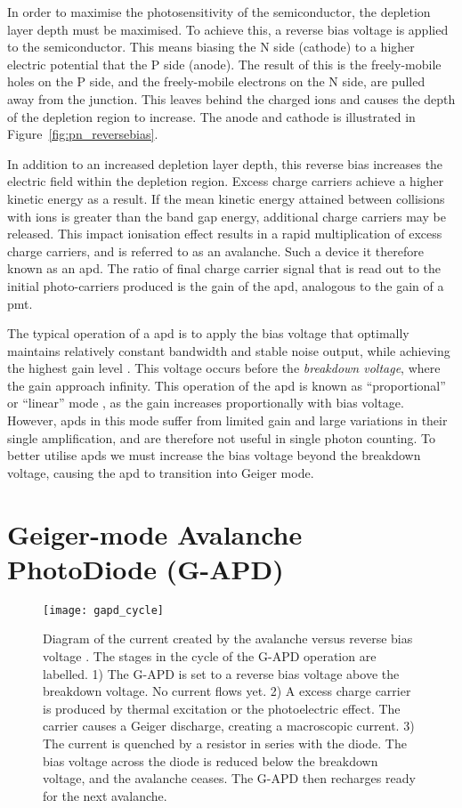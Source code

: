 In order to maximise the photosensitivity of the semiconductor, the depletion layer depth must be maximised. To achieve this, a reverse bias voltage is applied to the semiconductor. This means biasing the N side (cathode) to a higher electric potential that the P side (anode). The result of this is the freely-mobile holes on the P side, and the freely-mobile electrons on the N side, are pulled away from the junction. This leaves behind the charged ions and causes the depth of the depletion region to increase. The anode and cathode is illustrated in Figure~\ref{fig:pn_reversebias}.

In addition to an increased depletion layer depth, this reverse bias increases the electric field within the depletion region. Excess charge carriers achieve a higher kinetic energy as a result. If the mean kinetic energy attained between collisions with ions is greater than the band gap energy, additional charge carriers may be released. This impact ionisation effect results in a rapid multiplication of excess charge carriers, and is referred to as an avalanche. Such a device it therefore known as an \gls{apd}. The ratio of final charge carrier signal that is read out to the initial photo-carriers produced is the gain of the \gls{apd}, analogous to the gain of a \gls{pmt}.

The typical operation of a \gls{apd} is to apply the bias voltage that optimally maintains relatively constant bandwidth and stable noise output, while achieving the highest gain level \cite{Ghassemi2017}. This voltage occurs before the \textit{breakdown voltage}, where the gain approach infinity. This operation of the \gls{apd} is known as ``proportional'' or ``linear'' mode \cite{Otte2006}, as the gain increases proportionally with bias voltage. However, \glspl{apd} in this mode suffer from limited gain and large variations in their single amplification, and are therefore not useful in single photon counting. To better utilise \glspl{apd} we must increase the bias voltage beyond the breakdown voltage, causing the \gls{apd} to transition into Geiger mode.

\section{Geiger-mode Avalanche PhotoDiode (G-APD)}

\begin{figure}
	\centering
    \texttt{[image: gapd\_cycle]} 
	\caption[G-APD reverse bias voltage cycle.]{Diagram of the current created by the avalanche versus reverse bias voltage \cite{SensL2011}. The stages in the cycle of the G-APD operation are labelled. 1) The G-APD is set to a reverse bias voltage above the breakdown voltage. No current flows yet. 2) A excess charge carrier is produced by thermal excitation or the photoelectric effect. The carrier causes a Geiger discharge, creating a macroscopic current. 3) The current is quenched by a resistor in series with the diode. The bias voltage across the diode is reduced below the breakdown voltage, and the avalanche ceases. The G-APD then recharges ready for the next avalanche.}
	\label{fig:gapd_cycle}
\end{figure}

